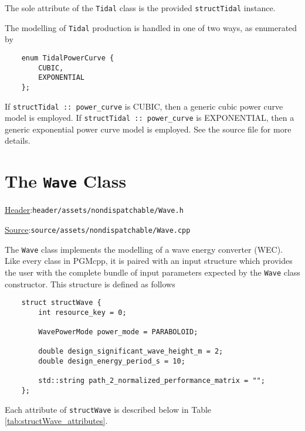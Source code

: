 \documentclass[12pt, letterpaper]{report}
\begin{document}
\noindent The sole attribute of the \texttt{Tidal} class is the provided \texttt{structTidal} instance.\par 
The modelling of \texttt{Tidal} production is handled in one of two ways, as enumerated by

\begin{verbatim}
    enum TidalPowerCurve {
        CUBIC,
        EXPONENTIAL
    };
\end{verbatim}

\noindent If \texttt{structTidal :: power\_curve} is CUBIC, then a generic cubic power curve model is employed. If \texttt{structTidal :: power\_curve} is EXPONENTIAL, then a generic exponential power curve model is employed. See the source file for more details.

\section{The \texttt{Wave} Class}

\begin{large}
\noindent\underline{Header}:\quad\texttt{header/assets/nondispatchable/Wave.h}\par
\noindent\underline{Source}:\quad\texttt{source/assets/nondispatchable/Wave.cpp}\par
\end{large}
\vspace{5mm}

The \texttt{Wave} class implements the modelling of a wave energy converter (WEC). Like every class in PGMcpp, it is paired with an input structure which provides the user with the complete bundle of input parameters expected by the \texttt{Wave} class constructor. This structure is defined as follows

\begin{verbatim}
    struct structWave {
        int resource_key = 0;
        
        WavePowerMode power_mode = PARABOLOID;
        
        double design_significant_wave_height_m = 2;
        double design_energy_period_s = 10;
        
        std::string path_2_normalized_performance_matrix = "";
    };
\end{verbatim}

\noindent Each attribute of \texttt{structWave} is described below in Table \ref{tab:structWave_attributes}.
\end{document}
